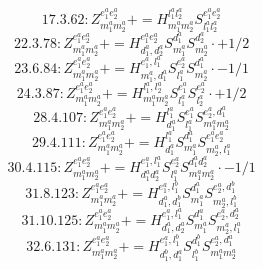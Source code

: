 \documentclass[letterpaper,10pt,fleqn,leqno,onecolumn]{article}
\begin{document}
\begin{equation} \;\;\;\;\;\;  17.3.62: Z^{e_{1}^{a}e_{2}^{a}}_{m_{1}^{a}m_{2}^{a}}+=H^{l_{1}^{a}l_{2}^{a}}_{m_{1}^{a}m_{2}^{a}}S^{e_{1}^{a}e_{2}^{a}}_{l_{1}^{a}l_{2}^{a}} \end{equation}
\begin{equation} \;\;\;\;\;\;  22.3.78: Z^{e_{1}^{a}e_{2}^{a}}_{m_{1}^{a}m_{2}^{a}}+=H^{e_{1}^{a}e_{2}^{a}}_{d_{1}^{a},d_{2}^{a}}S^{d_{1}^{a}}_{m_{1}^{a}}S^{d_{2}^{a}}_{m_{2}^{a}}\cdot +1/2 \end{equation}
\begin{equation} \;\;\;\;\;\;  23.6.84: Z^{e_{1}^{a}e_{2}^{a}}_{m_{1}^{a}m_{2}^{a}}+=H^{e_{1}^{a},l_{1}^{a}}_{m_{1}^{a},d_{1}^{a}}S^{e_{2}^{a}}_{l_{1}^{a}}S^{d_{1}^{a}}_{m_{2}^{a}}\cdot -1/1 \end{equation}
\begin{equation} \;\;\;\;\;\;  24.3.87: Z^{e_{1}^{a}e_{2}^{a}}_{m_{1}^{a}m_{2}^{a}}+=H^{l_{1}^{a},l_{2}^{a}}_{m_{1}^{a}m_{2}^{a}}S^{e_{1}^{a}}_{l_{1}^{a}}S^{e_{2}^{a}}_{l_{2}^{a}}\cdot +1/2 \end{equation}
\begin{equation} \;\;\;\;\;\;  28.4.107: Z^{e_{1}^{a}e_{2}^{a}}_{m_{1}^{a}m_{2}^{a}}+=H^{l_{1}^{a}}_{d_{1}^{a}}S^{e_{1}^{a}}_{l_{1}^{a}}S^{e_{2}^{a},d_{1}^{a}}_{m_{1}^{a}m_{2}^{a}} \end{equation}
\begin{equation} \;\;\;\;\;\;  29.4.111: Z^{e_{1}^{a}e_{2}^{a}}_{m_{1}^{a}m_{2}^{a}}+=H^{l_{1}^{a}}_{d_{1}^{a}}S^{d_{1}^{a}}_{m_{1}^{a}}S^{e_{1}^{a}e_{2}^{a}}_{m_{2}^{a},l_{1}^{a}} \end{equation}
\begin{equation} \;\;\;\;\;\;  30.4.115: Z^{e_{1}^{a}e_{2}^{a}}_{m_{1}^{a}m_{2}^{a}}+=H^{e_{1}^{a},l_{1}^{a}}_{d_{1}^{a}d_{2}^{a}}S^{e_{2}^{a}}_{l_{1}^{a}}S^{d_{1}^{a}d_{2}^{a}}_{m_{1}^{a}m_{2}^{a}}\cdot -1/1 \end{equation}
\begin{equation} \;\;\;\;\;\;  31.8.123: Z^{e_{1}^{a}e_{2}^{a}}_{m_{1}^{a}m_{2}^{a}}+=H^{e_{1}^{a},l_{1}^{b}}_{d_{1}^{a},d_{1}^{b}}S^{d_{1}^{a}}_{m_{1}^{a}}S^{e_{2}^{a},d_{1}^{b}}_{m_{2}^{a},l_{1}^{b}} \end{equation}
\begin{equation} \;\;\;\;\;\;  31.10.125: Z^{e_{1}^{a}e_{2}^{a}}_{m_{1}^{a}m_{2}^{a}}+=H^{e_{1}^{a},l_{1}^{a}}_{d_{1}^{a},d_{2}^{a}}S^{d_{1}^{a}}_{m_{1}^{a}}S^{e_{2}^{a},d_{2}^{a}}_{m_{2}^{a},l_{1}^{a}} \end{equation}
\begin{equation} \;\;\;\;\;\;  32.6.131: Z^{e_{1}^{a}e_{2}^{a}}_{m_{1}^{a}m_{2}^{a}}+=H^{e_{1}^{a},l_{1}^{b}}_{d_{1}^{b},d_{1}^{a}}S^{d_{1}^{b}}_{l_{1}^{b}}S^{e_{2}^{a},d_{1}^{a}}_{m_{1}^{a}m_{2}^{a}} \end{equation}
\end{document}
